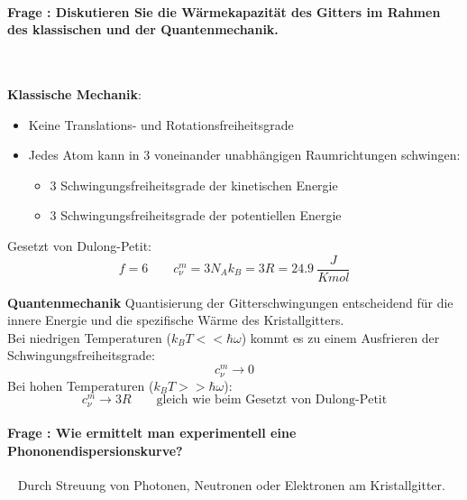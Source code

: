 \documentclass[a4paper, 11pt, ngerman, parskip=half-]{scrartcl}
\newcounter{question}
\newcommand{\question}[1]{\stepcounter{question}\paragraph{Frage \thequestion: #1}~}
\begin{document}
\question{Diskutieren Sie die Wärmekapazität des Gitters im Rahmen des klassischen und der Quantenmechanik.}
\label{q:16}

\textbf{Klassische Mechanik}:\\
\begin{itemize}
    \item Keine Translations- und Rotationsfreiheitsgrade
    \item Jedes Atom kann in 3 voneinander unabhängigen Raumrichtungen schwingen:
    \begin{itemize}
        \item 3 Schwingungsfreiheitsgrade der kinetischen Energie
        \item 3 Schwingungsfreiheitsgrade der potentiellen Energie
    \end{itemize}
\end{itemize}
Gesetzt von Dulong-Petit:
\begin{equation}
    f = 6 \qquad c_\nu ^m = 3N_Ak_B = 3R = \SI{24.9}{\frac{J}{K mol}}
\end{equation}

\textbf{Quantenmechanik}
Quantisierung der Gitterschwingungen entscheidend für die innere Energie und
die spezifische Wärme des Kristallgitters.\\
Bei niedrigen Temperaturen ($k_BT<<\hbar\omega$) kommt es zu einem Ausfrieren der Schwingungsfreiheitsgrade:
\begin{equation}
    c_\nu^m \rightarrow 0
\end{equation}
Bei hohen Temperaturen ($k_BT>>\hbar\omega$):
\begin{equation}
    c_\nu^m \rightarrow 3R \qquad \text{gleich wie beim Gesetzt von Dulong-Petit}
\end{equation}


\question{Wie ermittelt man experimentell eine Phononendispersionskurve?}
\label{q:17}
Durch Streuung von Photonen, Neutronen oder Elektronen am Kristallgitter. 
\end{document}
